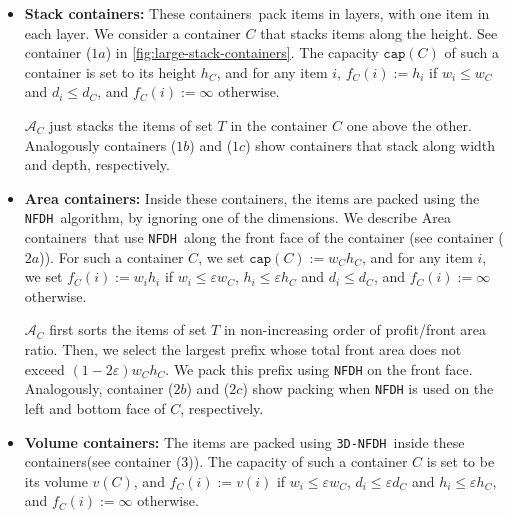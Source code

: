 \documentclass[10pt,a4paper]{amsart}
\newcommand{\kvn}[1]{#1}
\newcommand{\eps}{\varepsilon}
\renewcommand{\epsilon}{\varepsilon} %
\newcommand{\AM}{\mathcal{A}}
\newcommand{\boxes}{containers\xspace}
\newcommand{\NFDH}{\texttt{NFDH}\xspace}
\newcommand{\tNFDH}{\texttt{3D-NFDH}\xspace}
\theoremstyle{definition}
\begin{document}
\begin{itemize}
    
    
    \item \textbf{Stack \boxes:} These \boxes\ pack items in layers, with one item in each layer. We consider a container $C$ that stacks items along the height.  See container ($1a$) in \cref{fig:large-stack-containers}. The capacity $\mathtt{cap}(C)$ of such a container is set to its height $h_C$, and for any item $i$, $f_C(i):=h_i$ if $w_i \le w_C$ and $d_i \le d_C$, and $f_C(i):=\infty$ otherwise.

    $\AM_C$ just stacks the items of set $T$ in the container $C$ one above the other. Analogously containers ($1b$) and ($1c$) show containers that stack along width \kvn{and} depth, respectively.
    
    \item \textbf{Area \boxes:} Inside these \boxes, the items are packed using the \NFDH~algorithm, by ignoring one of the dimensions. We describe Area \boxes\ that use \NFDH~along the front face of the container (see container ($2a$)). For such a container $C$, we set $\mathtt{cap}(C):= w_Ch_C$, and for any item $i$, we set $f_C(i):= w_i h_i$ if $w_i \le \epsilon w_C$, $h_i \le \epsilon h_C$ and $d_i \le d_C$, and $f_C(i):= \infty$ otherwise. 

     \kvn{$\AM_C$ first sorts the items} of set $T$ in non-increasing order of profit/front area ratio.
    Then, we select the largest prefix whose total front area does not exceed $(1-2\eps)w_Ch_C$. We pack this prefix using \NFDH on the front face.
    Analogously, container ($2b$) and ($2c$) show packing when \NFDH is used on the left and bottom face of $C$, respectively.
    
    
    \item \textbf{Volume \boxes:} The items are packed using \tNFDH~inside these \boxes (see container (3)). The capacity of such a container $C$ is set to be its volume $v(C)$, and $f_C(i):= v(i)$ if $w_i \le \epsilon w_C$, $d_i \le \epsilon d_C$ and $h_i \le \epsilon h_C$, and $f_C(i) := \infty$ otherwise.


\end{itemize}
\end{document}
